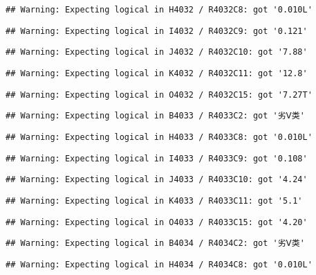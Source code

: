 \documentclass[
]{article}
\begin{document}
\begin{verbatim}
## Warning: Expecting logical in H4032 / R4032C8: got '0.010L'
\end{verbatim}

\begin{verbatim}
## Warning: Expecting logical in I4032 / R4032C9: got '0.121'
\end{verbatim}

\begin{verbatim}
## Warning: Expecting logical in J4032 / R4032C10: got '7.88'
\end{verbatim}

\begin{verbatim}
## Warning: Expecting logical in K4032 / R4032C11: got '12.8'
\end{verbatim}

\begin{verbatim}
## Warning: Expecting logical in O4032 / R4032C15: got '7.27T'
\end{verbatim}

\begin{verbatim}
## Warning: Expecting logical in B4033 / R4033C2: got '劣Ⅴ类'
\end{verbatim}

\begin{verbatim}
## Warning: Expecting logical in H4033 / R4033C8: got '0.010L'
\end{verbatim}

\begin{verbatim}
## Warning: Expecting logical in I4033 / R4033C9: got '0.108'
\end{verbatim}

\begin{verbatim}
## Warning: Expecting logical in J4033 / R4033C10: got '4.24'
\end{verbatim}

\begin{verbatim}
## Warning: Expecting logical in K4033 / R4033C11: got '5.1'
\end{verbatim}

\begin{verbatim}
## Warning: Expecting logical in O4033 / R4033C15: got '4.20'
\end{verbatim}

\begin{verbatim}
## Warning: Expecting logical in B4034 / R4034C2: got '劣Ⅴ类'
\end{verbatim}

\begin{verbatim}
## Warning: Expecting logical in H4034 / R4034C8: got '0.010L'
\end{verbatim}
\end{document}

